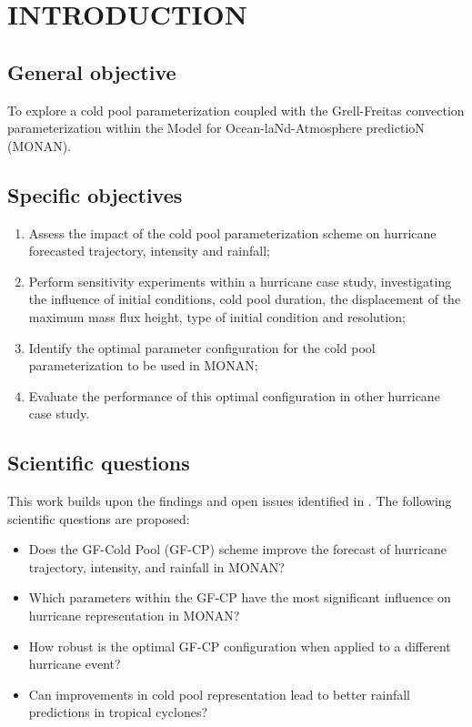 
\chapter{INTRODUCTION}


\section{General objective}

To explore a cold pool parameterization coupled with the Grell-Freitas convection parameterization within the Model for Ocean-laNd-Atmosphere predictioN (MONAN).


\section{Specific objectives}

\begin{enumerate}
    \item Assess the impact of the cold pool parameterization scheme on hurricane forecasted trajectory, intensity and rainfall;
    \item Perform sensitivity experiments within a hurricane case study, investigating the influence of initial conditions, cold pool duration, the displacement of the maximum mass flux height, type of initial condition and resolution;
    \item Identify the optimal parameter configuration for the cold pool parameterization to be used in MONAN;
    \item Evaluate the performance of this optimal configuration in other hurricane case study.
\end{enumerate}

\section{Scientific questions}

This work builds upon the findings and open issues identified in . The following scientific questions are proposed:

\begin{itemize}
    \item Does the GF-Cold Pool (GF-CP) scheme improve the forecast of hurricane trajectory, intensity, and rainfall in MONAN?
    \item Which parameters within the GF-CP have the most significant influence on hurricane representation in MONAN?
    \item How robust is the optimal GF-CP configuration when applied to a different hurricane event?
    \item Can improvements in cold pool representation lead to better rainfall predictions in tropical cyclones?
\end{itemize}

